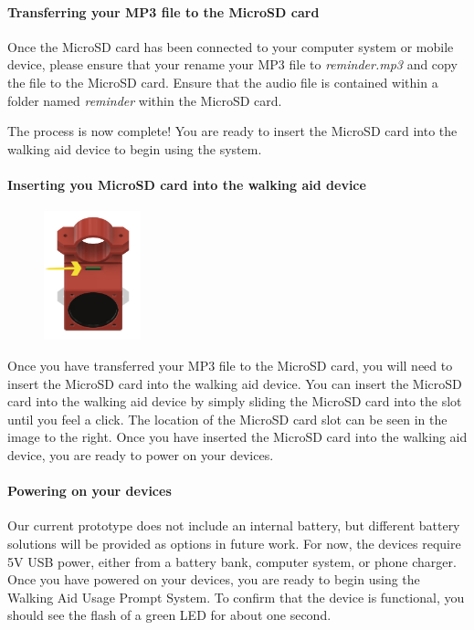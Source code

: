 				\paragraph{Transferring your MP3 file to the MicroSD card}\mbox{}

				Once the MicroSD card has been connected to your computer system or mobile device, please ensure that your rename your MP3 file to \textit{reminder.mp3} and copy the file to the MicroSD card. Ensure that the audio file is contained within a folder named \textit{reminder} within the MicroSD card.

				The process is now complete! You are ready to insert the MicroSD card into the walking aid device to begin using the system.

				\paragraph{Inserting you MicroSD card into the walking aid device}\mbox{}

				\begin{figure}
					\vspace{-3.5em}
					\centering
					\includegraphics[width=0.25\textwidth]{graphics/sd_arrow.png}
				\end{figure}

				Once you have transferred your MP3 file to the MicroSD card, you will need to insert the MicroSD card into the walking aid device. You can insert the MicroSD card into the walking aid device by simply sliding the MicroSD card into the slot until you feel a click. The location of the MicroSD card slot can be seen in the image to the right. Once you have inserted the MicroSD card into the walking aid device, you are ready to power on your devices.

				\paragraph{Powering on your devices}\mbox{}

				Our current prototype does not include an internal battery, but different battery solutions will be provided as options in future work. For now, the devices require 5V USB power, either from a battery bank, computer system, or phone charger. Once you have powered on your devices, you are ready to begin using the Walking Aid Usage Prompt System. To confirm that the device is functional, you should see the flash of a green LED for about one second.

